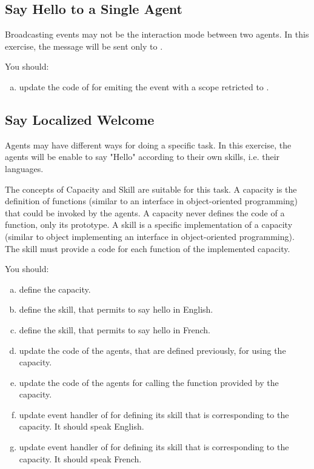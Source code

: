 \documentclass[article,english,nodocumentinfo]{multiagentfrreport}
\begin{document}
\subsection{Say Hello to a Single Agent}

Broadcasting events may not be the interaction mode between two agents.
In this exercise, the  message will be sent only to .

You should:
\begin{enumerate}[a)]
\item update the code of  for emiting the event with a scope retricted to .
\end{enumerate}

\subsection{Say Localized Welcome}

Agents may have different ways for doing a specific task.
In this exercise, the agents will be enable to say "Hello" according to their own skills, i.e. their languages.

The concepts of Capacity and Skill are suitable for this task.
A capacity is the definition of functions (similar to an interface in object-oriented programming) that could be invoked by the agents. A capacity never defines the code of a function, only its prototype.
A skill is a specific implementation of a capacity (similar to object implementing an interface in object-oriented programming). The skill must provide a code for each function of the implemented capacity.

You should:
\begin{enumerate}[a)]
\item define the  capacity.
\item define the  skill, that permits to say hello in English.
\item define the  skill, that permits to say hello in French.
\item update the code of the agents, that are defined previously, for using the  capacity.
\item update the code of the agents for calling the function provided by the  capacity.
\item update  event handler of  for defining its skill that is corresponding to the  capacity. It should speak English.
\item update  event handler of  for defining its skill that is corresponding to the  capacity. It should speak French.
\end{enumerate}
\end{document}

